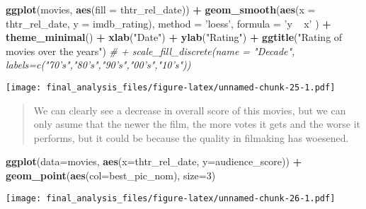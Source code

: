 \documentclass[]{article}
\newenvironment{Shaded}{\begin{snugshade}}{\end{snugshade}}
\newcommand{\CommentTok}[1]{\textcolor[rgb]{0.56,0.35,0.01}{\textit{#1}}}
\newcommand{\DataTypeTok}[1]{\textcolor[rgb]{0.13,0.29,0.53}{#1}}
\newcommand{\DecValTok}[1]{\textcolor[rgb]{0.00,0.00,0.81}{#1}}
\newcommand{\KeywordTok}[1]{\textcolor[rgb]{0.13,0.29,0.53}{\textbf{#1}}}
\newcommand{\NormalTok}[1]{#1}
\newcommand{\OperatorTok}[1]{\textcolor[rgb]{0.81,0.36,0.00}{\textbf{#1}}}
\newcommand{\StringTok}[1]{\textcolor[rgb]{0.31,0.60,0.02}{#1}}
\begin{document}
\begin{Shaded}
\begin{Highlighting}[]
\KeywordTok{ggplot}\NormalTok{(movies, }\KeywordTok{aes}\NormalTok{(}\DataTypeTok{fill =}\NormalTok{ thtr_rel_date)) }\OperatorTok{+}\StringTok{ }\KeywordTok{geom_smooth}\NormalTok{(}\KeywordTok{aes}\NormalTok{(}\DataTypeTok{x =}\NormalTok{ thtr_rel_date, }\DataTypeTok{y =}\NormalTok{ imdb_rating), }\DataTypeTok{method =} \StringTok{'loess'}\NormalTok{, }\DataTypeTok{formula =} \StringTok{'y ~ x'}
\NormalTok{) }\OperatorTok{+}\StringTok{ }\KeywordTok{theme_minimal}\NormalTok{() }\OperatorTok{+}\StringTok{ }\KeywordTok{xlab}\NormalTok{(}\StringTok{"Date"}\NormalTok{) }\OperatorTok{+}\StringTok{ }\KeywordTok{ylab}\NormalTok{(}\StringTok{"Rating"}\NormalTok{) }\OperatorTok{+}\StringTok{ }\KeywordTok{ggtitle}\NormalTok{(}\StringTok{"Rating of  movies over the years"}\NormalTok{) }\CommentTok{# + scale_fill_discrete(name = "Decade", labels=c("70's","80's","90's","00's","10's"))}
\end{Highlighting}
\end{Shaded}

\texttt{[image: final\_analysis\_files/figure-latex/unnamed-chunk-25-1.pdf]}

\begin{quote}
We can clearly see a decrease in overall score of this movies, but we
can only asume that the newer the film, the more votes it gets and the
worse it performs, but it could be because the quality in filmaking has
woesened.
\end{quote}

\begin{Shaded}
\begin{Highlighting}[]
\KeywordTok{ggplot}\NormalTok{(}\DataTypeTok{data=}\NormalTok{movies, }\KeywordTok{aes}\NormalTok{(}\DataTypeTok{x=}\NormalTok{thtr_rel_date, }\DataTypeTok{y=}\NormalTok{audience_score)) }\OperatorTok{+}\StringTok{ }\KeywordTok{geom_point}\NormalTok{(}\KeywordTok{aes}\NormalTok{(}\DataTypeTok{col=}\NormalTok{best_pic_nom), }\DataTypeTok{size=}\DecValTok{3}\NormalTok{)}
\end{Highlighting}
\end{Shaded}

\texttt{[image: final\_analysis\_files/figure-latex/unnamed-chunk-26-1.pdf]}
\end{document}
